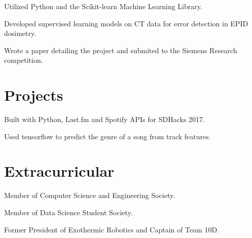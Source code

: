 \documentclass[]{deedy-resume-openfont}
\begin{document}
\begin{minipage}[t]{0.66\textwidth}
\begin{tightemize}
\item Utilized Python and the Scikit-learn Machine Learning Library.
\item Developed supervised learning models on CT data for error detection in EPID dosimetry.
\item Wrote a paper detailing the project and submited to the Siemens Research competition.
\end{tightemize}
\sectionsep


\section{Projects}
\begin{tightemize}
\item Built with Python, Last.fm and Spotify APIs for SDHacks 2017.
\item Used tensorflow to predict the genre of a song from track features.
\end{tightemize}
\sectionsep


\section{Extracurricular} 
\vspace{2mm}
\begin{tightemize}
\item Member of Computer Science and Engineering Society.
\item Member of Data Science Student Society.
\item Former President of Exothermic Robotics and Captain of Team 10D.
\end{tightemize}
\sectionsep

\end{minipage} 
\end{document}
